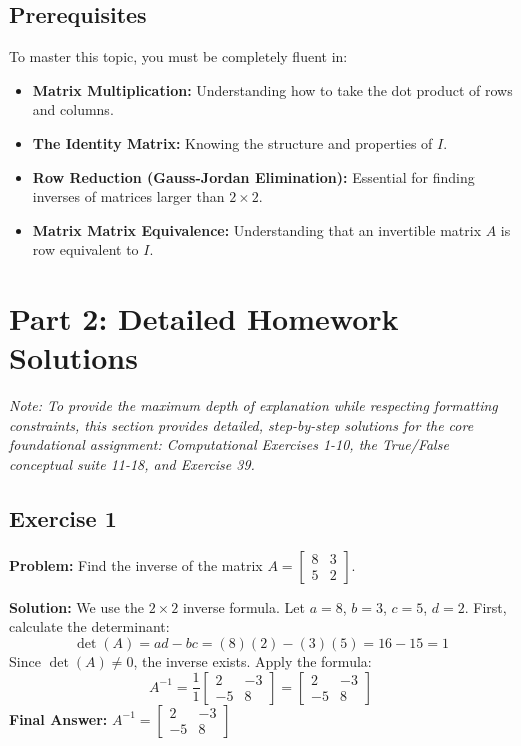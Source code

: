 \documentclass[11pt]{article}
\begin{document}
\subsection{Prerequisites}
To master this topic, you must be completely fluent in:
\begin{itemize}
    \item \textbf{Matrix Multiplication:} Understanding how to take the dot product of rows and columns.
    \item \textbf{The Identity Matrix:} Knowing the structure and properties of $I$.
    \item \textbf{Row Reduction (Gauss-Jordan Elimination):} Essential for finding inverses of matrices larger than $2 \times 2$.
    \item \textbf{Matrix Matrix Equivalence:} Understanding that an invertible matrix $A$ is row equivalent to $I$.
\end{itemize}

\newpage
\section{Part 2: Detailed Homework Solutions}
\textit{Note: To provide the maximum depth of explanation while respecting formatting constraints, this section provides detailed, step-by-step solutions for the core foundational assignment: Computational Exercises 1-10, the True/False conceptual suite 11-18, and Exercise 39.}

\subsection{Exercise 1}
\textbf{Problem:} Find the inverse of the matrix $A = \begin{bmatrix} 8 & 3 \\ 5 & 2 \end{bmatrix}$.

\textbf{Solution:}
We use the $2 \times 2$ inverse formula. Let $a=8$, $b=3$, $c=5$, $d=2$.
First, calculate the determinant:
\[ \det(A) = ad - bc = (8)(2) - (3)(5) = 16 - 15 = 1 \]
Since $\det(A) \neq 0$, the inverse exists. Apply the formula:
\[ A^{-1} = \frac{1}{1} \begin{bmatrix} 2 & -3 \\ -5 & 8 \end{bmatrix} = \begin{bmatrix} 2 & -3 \\ -5 & 8 \end{bmatrix} \]
\textbf{Final Answer:} $A^{-1} = \begin{bmatrix} 2 & -3 \\ -5 & 8 \end{bmatrix}$
\end{document}

